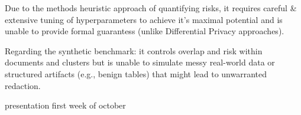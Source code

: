 
Due to the methods heuristic approach of quantifying risks, it requires careful \& extensive tuning of hyperparameters to achieve it's maximal potential and is unable to provide formal guarantess (unlike Differential Privacy approaches). 


Regarding the synthetic benchmark: it controls overlap and risk within documents and clusters but is unable to simulate messy real-world data or structured artifacts (e.g., benign tables) that might lead to  unwarranted redaction.



presentation first week of october


